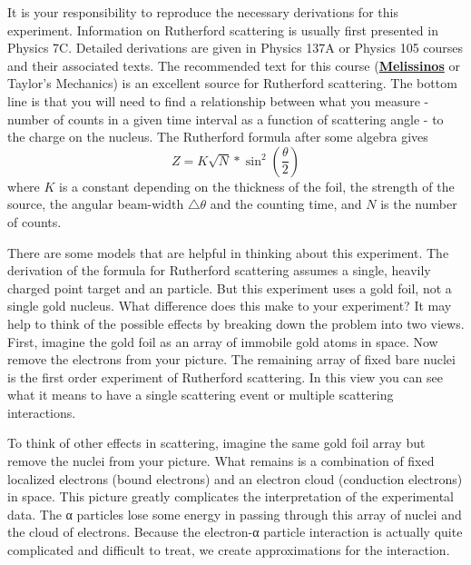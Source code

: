 \documentclass{../lab}
\begin{document}
It is your responsibility to reproduce the necessary derivations for this experiment. Information on Rutherford scattering is usually first presented in Physics 7C. Detailed derivations are given in Physics 137A or Physics 105 courses and their associated texts. The recommended text for this course (\href{https://drive.google.com/file/d/1XUpk_MVeLUhutm548PpIWOzJOl3SFZqI/view?usp=drive_link}{\textbf{Melissinos}} or Taylor's Mechanics) is an excellent source for Rutherford scattering. The bottom line is that you will need to find a relationship between what you measure - number of counts in a given time interval as a function of scattering angle - to the charge on the nucleus. The Rutherford formula after some algebra gives
\[Z = K \sqrt{N} * \sin^2 \left(\frac{\theta}{2}\right)\]
where $K$ is a constant depending on the thickness of the foil, 
the strength of the source, the angular beam-width $\triangle \theta$ and the counting time, 
and $N$ is the number of counts.

There are some models that are helpful in thinking about this experiment. The derivation of the formula for Rutherford scattering assumes a single, heavily charged point target and an \textalpha{} particle. But this experiment uses a gold foil, not a single gold nucleus. What difference does this make to your experiment? It may help to think of the possible effects by breaking down the problem into two views. First, imagine the gold foil as an array of immobile gold atoms in space. Now remove the electrons from your picture. The remaining array of fixed bare nuclei is the first order experiment of Rutherford scattering. In this view you can see what it means to have a single scattering event or multiple scattering interactions.

To think of other effects in scattering, imagine the same gold foil array but remove the nuclei from your picture. What remains is a combination of fixed localized electrons (bound electrons) and an electron cloud (conduction electrons) in space. This picture greatly complicates the interpretation of the experimental data. The α particles lose some energy in passing through this array of nuclei and the cloud of electrons. Because the electron-α particle interaction is actually quite complicated and difficult to treat, we create approximations for the interaction.
\end{document}
